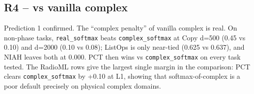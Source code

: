 \documentclass[11pt,a4paper]{article}
\theoremstyle{plain}
\theoremstyle{definition}
\begin{document}
\subsection{R4 -- vs vanilla complex}
\noindent
\begin{minipage}[t]{0.47\textwidth}
\vspace{0pt}
\raggedright
\sloppy
Prediction 1 confirmed. The ``complex penalty'' of vanilla complex is real. On non-phase tasks, \texttt{real\_softmax} beats \texttt{complex\_softmax} at Copy d=500 (0.45 vs 0.10) and d=2000 (0.10 vs 0.08); ListOps is only near-tied (0.625 vs 0.637), and NIAH leaves both at 0.000. PCT then wins vs \texttt{complex\_softmax} on every task tested. The RadioML rows give the largest single margin in the comparison: PCT clears \texttt{complex\_softmax} by +0.10 at L1, showing that softmax-of-complex is a poor default precisely on physical complex domains.
\end{minipage}\hfill
\begin{minipage}[t]{0.30\textwidth}
\vspace{0pt}
\centering
{\fontsize{5.6}{6.4}\selectfont
\setlength{\tabcolsep}{1.4pt}
\renewcommand{\arraystretch}{1.05}
}
\captionsetup{skip=2pt}
\end{minipage}
\par\medskip
\end{document}
